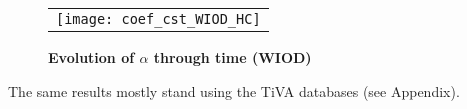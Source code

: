 \documentclass[11pt,a4paper]{article}
\begin{document}
\begin{figure}[!h]
\centering
\caption{\footnotesize{\textbf{Evolution of $\alpha$ through time (WIOD)}}}
\begin{tabular}{c}
\texttt{[image: coef\_cst\_WIOD\_HC]}\\
\end{tabular}
\label{fig:evolution_cst}
\end{figure}


The same results mostly stand using the TiVA databases (see Appendix).


%
%
%
%
%
\end{document}
